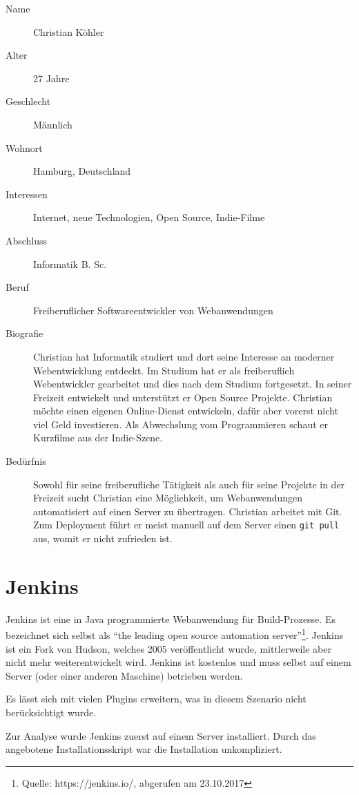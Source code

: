 \begin{description}
  \item [Name] Christian Köhler
  \item [Alter] 27 Jahre
  \item [Geschlecht] Männlich
  \item [Wohnort] Hamburg, Deutschland
  \item [Interessen] Internet, neue Technologien, Open Source, Indie-Filme
  \item [Abschluss] Informatik B. Sc.
  \item [Beruf] Freiberuflicher Softwareentwickler von Webanwendungen
  \item [Biografie] Christian hat Informatik studiert und dort seine Interesse an moderner Webentwicklung entdeckt. Im Studium hat er als freiberuflich Webentwickler gearbeitet und dies nach dem Studium fortgesetzt. In seiner Freizeit entwickelt und unterstützt er Open Source Projekte. Christian möchte einen eigenen Online-Dienst entwickeln, dafür aber vorerst nicht viel Geld investieren. Als Abwechslung vom Programmieren schaut er Kurzfilme aus der Indie-Szene.
  \item [Bedürfnis] Sowohl für seine freiberufliche Tätigkeit als auch für seine Projekte in der Freizeit sucht Christian eine Möglichkeit, um Webanwendungen automatisiert auf einen Server zu übertragen. Christian arbeitet mit Git. Zum Deployment führt er meist manuell auf dem Server einen \texttt{git pull} aus, womit er nicht zufrieden ist.
\end{description}

\section{Jenkins}
\label{sec:analyse-jenkins}

Jenkins ist eine in Java programmierte Webanwendung für Build-Prozesse. Es bezeichnet sich selbst als ``the leading open source automation server''\footnote{Quelle: https://jenkins.io/, abgerufen am 23.10.2017}. Jenkins ist ein Fork von Hudson, welches 2005 veröffentlicht wurde, mittlerweile aber nicht mehr weiterentwickelt wird. Jenkins ist kostenlos und muss selbst auf einem Server (oder einer anderen Maschine) betrieben werden.

Es lässt sich mit vielen Plugins erweitern, was in diesem Szenario nicht berücksichtigt wurde.

Zur Analyse wurde Jenkins zuerst auf einem Server installiert. Durch das angebotene Installationsskript war die Installation unkompliziert.

